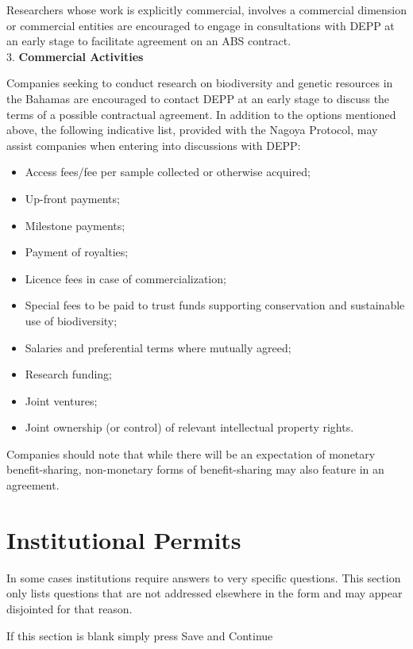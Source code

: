 \documentclass[
]{book}
\providecommand{\tightlist}{%
  \setlength{\itemsep}{0pt}\setlength{\parskip}{0pt}}
\begin{document}
Researchers whose work is explicitly commercial, involves a commercial dimension or commercial entities are encouraged to engage in consultations with DEPP at an early stage to facilitate agreement on an ABS contract.\\
3. \textbf{Commercial Activities}

Companies seeking to conduct research on biodiversity and genetic resources in the Bahamas are encouraged to contact DEPP at an early stage to discuss the terms of a possible contractual agreement. In addition to the options mentioned above, the following indicative list, provided with the Nagoya Protocol, may assist companies when entering into discussions with DEPP:

\begin{itemize}
\tightlist
\item
  Access fees/fee per sample collected or otherwise acquired;
\item
  Up-front payments;
\item
  Milestone payments;
\item
  Payment of royalties;
\item
  Licence fees in case of commercialization;
\item
  Special fees to be paid to trust funds supporting conservation and sustainable use of biodiversity;
\item
  Salaries and preferential terms where mutually agreed;
\item
  Research funding;
\item
  Joint ventures;
\item
  Joint ownership (or control) of relevant intellectual property rights.
\end{itemize}

Companies should note that while there will be an expectation of monetary benefit-sharing, non-monetary forms of benefit-sharing may also feature in an agreement.

\hypertarget{institutional-permits}{%
\chapter{Institutional Permits}\label{institutional-permits}}

In some cases institutions require answers to very specific questions. This section only lists questions that are not addressed elsewhere in the form and may appear disjointed for that reason.

If this section is blank simply press Save and Continue
\end{document}
